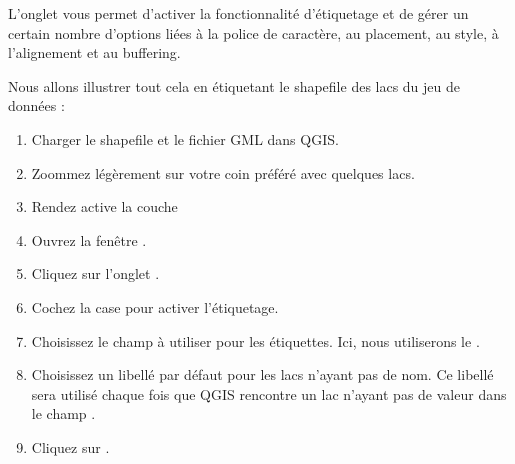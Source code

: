 L'onglet  vous permet d'activer la fonctionnalité d'étiquetage et de gérer un certain nombre d'options liées à la police de caractère, au placement, au style, à l'alignement et au buffering.

Nous allons illustrer tout cela en étiquetant le shapefile des lacs du jeu de données  :

\begin{enumerate}
\item Charger le shapefile  et le fichier GML  dans QGIS.
\item Zoommez légèrement sur votre coin préféré avec quelques lacs.
\item Rendez active la couche 
\item Ouvrez la fenêtre .
\item Cliquez sur l'onglet .
\item Cochez la case  pour activer l'étiquetage.
\item Choisissez le champ à utiliser pour les étiquettes. Ici, nous utiliserons le .
\item Choisissez un libellé par défaut pour les lacs n'ayant pas de nom. Ce libellé sera utilisé chaque fois que QGIS rencontre un lac n'ayant pas de valeur dans le champ .
\item Cliquez sur .
\end{enumerate}

